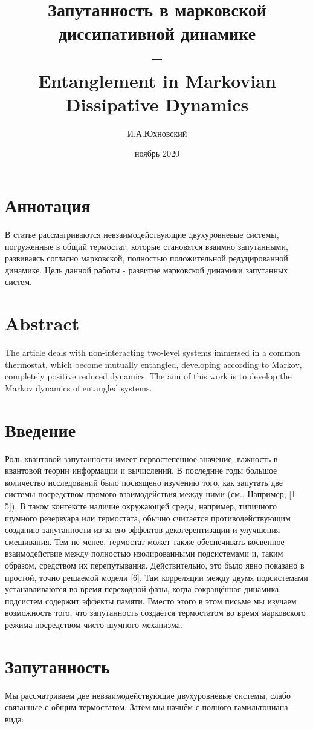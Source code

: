 \documentclass[11pt]{article}
\title{\textbf{ Запутанность в марковской диссипативной динамике \\ -- \\ 
	Entanglement in Markovian Dissipative Dynamics}}
\author{И.А.Юхновский}
\date{ноябрь 2020}
\begin{document}
\maketitle
\thispagestyle{empty}
\section*{Аннотация}
В статье рассматриваются невзаимодействующие двухуровневые системы, погруженные в общий термостат, которые становятся взаимно запутанными, развиваясь согласно марковской, полностью положительной редуцированной динамике. Цель данной работы - развитие марковской динамики запутанных систем.


\section*{Abstract}
The article deals with non-interacting two-level systems immersed in a common thermostat, which become mutually entangled, developing according to Markov, completely positive reduced dynamics. The aim of this work is to develop the Markov dynamics of entangled systems.

\tableofcontents{}

\section{Введение}
Роль квантовой запутанности имеет первостепенное значение.
важность в квантовой теории информации и вычислений. В последние годы большое количество исследований было посвящено изучению того, как запутать две системы посредством прямого взаимодействия между ними (см., Например, [1–5]). В таком контексте наличие окружающей среды, например, типичного шумного резервуара или термостата, обычно считается противодействующим созданию запутанности из-за его эффектов декогерентизации и улучшения смешивания. Тем не менее, термостат может также обеспечивать косвенное взаимодействие между полностью изолированными подсистемами и, таким образом, средством их перепутывания. Действительно, это было явно показано в простой, точно решаемой модели [6]. Там корреляции между двумя подсистемами устанавливаются во время переходной фазы, когда сокращённая динамика подсистем содержит эффекты памяти. Вместо этого в этом письме мы изучаем возможность того, что запутанность создаётся термостатом во время марковского режима посредством чисто шумного механизма. 

\section{Запутанность}
Мы рассматриваем две невзаимодействующие двухуровневые системы, слабо связанные с общим термостатом. Затем мы начнём с полного гамильтониана вида:
\end{document}
